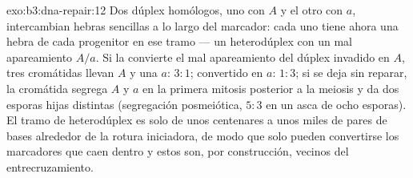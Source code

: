 \begin{solution}{exo:b3:dna-repair:12}
Dos dúplex homólogos, uno con $A$ y el otro con $a$, intercambian hebras
sencillas a lo largo del marcador: cada uno tiene ahora una hebra de cada
progenitor en ese tramo --- un heterodúplex con un mal apareamiento
$A/a$. Si la  convierte el mal
apareamiento del dúplex invadido en $A$, tres cromátidas llevan $A$ y una
$a$: $3{:}1$; convertido en $a$: $1{:}3$; si se deja sin reparar, la
cromátida segrega $A$ y $a$ en la primera mitosis posterior a la meiosis
y da dos esporas hijas distintas (segregación posmeiótica, $5{:}3$ en un
asca de ocho esporas). El tramo de heterodúplex es solo de unos
centenares a unos miles de pares de bases alrededor de la rotura
iniciadora, de modo que solo pueden convertirse los marcadores que caen
dentro y estos son, por construcción, vecinos del entrecruzamiento.
\end{solution}

